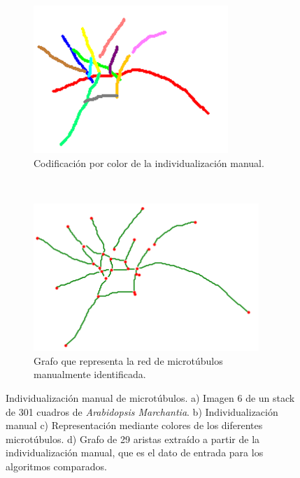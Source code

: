 \begin{figure}[h!]
\begin{subfigure}[t]{0.49\textwidth}
        \centering
        \includegraphics[height=2.2in]{benchImages/50-ROIs-Spinning-Marchantia-solved-rot-unlabeled.png}
        \caption{Codificaci\'on por color de la individualizaci\'on manual.}
        \label{fig:SpinningMarchantia-indivManual}
    \end{subfigure}
    ~
    \begin{subfigure}[t]{0.49\textwidth}
        \centering
        \includegraphics[height=2.2in]{benchImages/50-ROIs-Spinning-Marchantia-graph-og.png}
        \caption{Grafo que representa la red de microt\'ubulos manualmente identificada.}
        \label{fig:SpinningMarchantia-graph}
    \end{subfigure}
    \caption[Muestra MT-A de {\it Arabidopsis Marchantia} con su individualizaci\'on manual de microt\'ubulos.]{Individualizaci\'on manual de microt\'ubulos. a) Imagen 6 de un stack de 301 cuadros de {\it Arabidopsis Marchantia}. b) Individualizaci\'on manual c) Representaci\'on mediante colores de los diferentes microt\'ubulos. d) Grafo de 29 aristas extra\'ido a partir de la individualizaci\'on manual, que es el dato de entrada para los algoritmos comparados.}
    \label{fig:SpinningMarchantia}
\end{figure}



